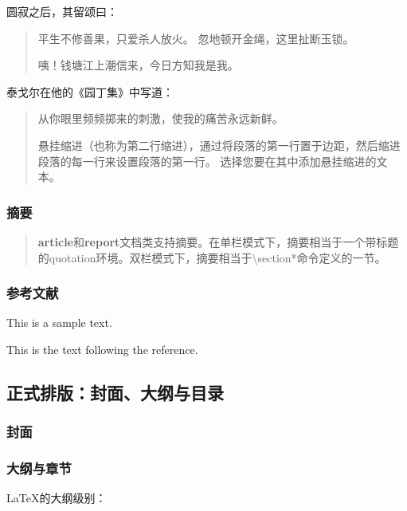 \documentclass{ctexart}
\begin{document}
            圆寂之后，其留颂曰：
            \begin{quotation}
                平生不修善果，只爱杀人放火。
                忽地顿开金绳，这里扯断玉锁。

                咦！钱塘江上潮信来，今日方知我是我。
            \end{quotation}

            泰戈尔在他的《园丁集》中写道：
            \begin{verse}
                从你眼里频频掷来的刺激，使我的痛苦永远新鲜。


                悬挂缩进（也称为第二行缩进），通过将段落的第一行置于边距，然后缩进段落的每一行来设置段落的第一行。 选择您要在其中添加悬挂缩进的文本。
            \end{verse}

        \subsubsection{摘要}
            \renewcommand{\abstractname}{这是摘要} %
            \begin{abstract}
                \textbf{article}和\textbf{report}文档类支持摘要。在单栏模式下，摘要相当于一个带标题的quotation环境。双栏模式下，摘要相当于\textbackslash section*命令定义的一节。
            \end{abstract}
        
        \subsubsection{参考文献}
            This is a sample text.\cite{author1.year1,author2.year2}

            This is the text following the reference. 


    \subsection{正式排版：封面、大纲与目录}
        \subsubsection{封面}
        \subsubsection{大纲与章节}
            \LaTeX 的大纲级别：
\end{document}
